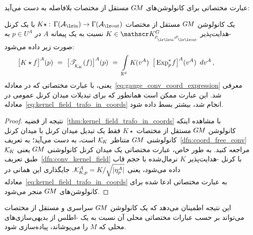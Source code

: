 عبارت مختصاتی برای کانولوشن‌های $G\mkern-1.4muM$ مستقل از مختصات بلافاصله به دست می‌آید:
\begin{thm}
\label{thm:gauge_equiv_conv_from_coordinate_free}
    یک کانولوشن $G\mkern-1.4muM$ مستقل از مختصات
    $K\star:\, \Gamma(\Ain) \to \Gamma(\Aout)$
    با یک کرنل -هدایت‌پذیر $K\in\KG$ نسبت به یک پیمانه $A$ در $p\in U^A$ به صورت زیر داده می‌شود:
    \begin{align}
        &\mkern-40mu
        \big[ K\star f \big]^A (p)
        \ =\ \big[ \TKK(f) \big]^A(p)
        \ =\ \int\limits_{\R^d}
            K \mkern-1mu (v^A) \,\ 
            \big[ \Expspf \big]^A (v^A)
            \,\ dv^A \,,
    \end{align}
    یعنی، با عبارت مختصاتی که در معادله~\eqref{eq:gauge_conv_coord_expression} معرفی شد.
    این عبارت ممکن است همانطور که برای تبدیلات میدان کرنل عمومی در معادله~\eqref{eq:kernel_field_trafo_in_coords} انجام شد، بیشتر بسط داده شود.
\end{thm}
\begin{proof}
    نتیجه از قضیه~\ref{thm:kernel_field_trafo_in_coords} با مشاهده اینکه کانولوشن $G\mkern-1.4muM$ مستقل از مختصات $K\star$ فقط یک تبدیل میدان کرنل با میدان کرنل کانولوشنی $G\mkern-1.4muM$ متناظر $\mathcal{K}_{\mkern-2mu K}$ است، به دست می‌آید؛ به تعریف~\ref{dfn:coord_free_conv} مراجعه کنید.
    به طور خاص، عبارت مختصاتی یک میدان کرنل کانولوشنی $G\mkern-1.4muM$ یعنی $\mathcal{K}_{\mkern-2mu K}$ طبق تعریف~\ref{dfn:conv_kernel_field} با کرنل \lr{G}-هدایت‌پذیر $K$ نرمال‌شده با حجم قاب داده می‌شود، یعنی $\mathcal{K}_{\mkern-2mu K \mkern-2mu, p}^A = K/ \sqrt{|\eta_p^A|}$.
    جایگذاری این همانی در معادله~\eqref{eq:kernel_field_trafo_in_coords} به عبارت مختصاتی ادعا شده برای کانولوشن‌های $G\mkern-1.4muM$ منجر می‌شود.
\end{proof}

این نتیجه اطمینان می‌دهد که یک کانولوشن $G\mkern-1.4muM$ سراسری و مستقل از مختصات می‌تواند بر حسب عبارات مختصاتی محلی آن نسبت به یک -اطلس از بدیهی‌سازی‌های محلی که $M$ را می‌پوشاند، پیاده‌سازی شود.